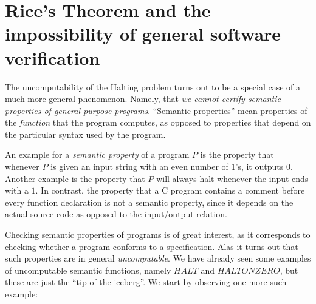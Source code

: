 \section{Rice's Theorem and the impossibility of general software
verification}\label{Rices-Theorem-and-the-imp}

The uncomputability of the Halting problem turns out to be a special
case of a much more general phenomenon. Namely, that \emph{we cannot
certify semantic properties of general purpose programs}. ``Semantic
properties'' mean properties of the \emph{function} that the program
computes, as opposed to properties that depend on the particular syntax
used by the program.

An example for a \emph{semantic property} of a program \(P\) is the
property that whenever \(P\) is given an input string with an even
number of \(1\)'s, it outputs \(0\). Another example is the property
that \(P\) will always halt whenever the input ends with a \(1\). In
contrast, the property that a C program contains a comment before every
function declaration is not a semantic property, since it depends on the
actual source code as opposed to the input/output relation.

Checking semantic properties of programs is of great interest, as it
corresponds to checking whether a program conforms to a specification.
Alas it turns out that such properties are in general
\emph{uncomputable}. We have already seen some examples of uncomputable
semantic functions, namely \(\ensuremath{\mathit{HALT}}\) and
\(\ensuremath{\mathit{HALTONZERO}}\), but these are just the ``tip of
the iceberg''. We start by observing one more such example:

\hypertarget{allzero-thm}{}


